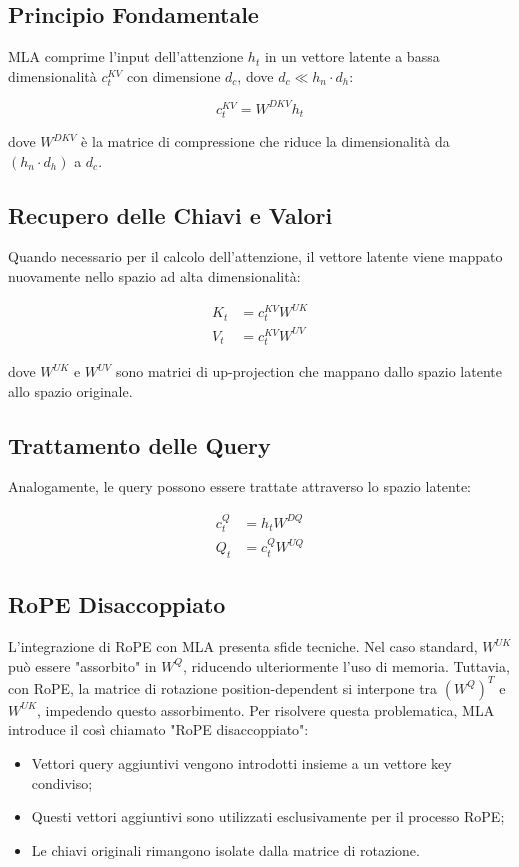 \subsection{Principio Fondamentale}
MLA comprime l'input dell'attenzione $h_t$ in un vettore latente a bassa dimensionalità $c_t^{KV}$ con dimensione $d_c$, dove $d_c \ll h_n \cdot d_h$:

\begin{equation}
    c_t^{KV} = W^{DKV}h_t
\end{equation}

dove $W^{DKV}$ è la matrice di compressione che riduce la dimensionalità da $(h_n \cdot d_h)$ a $d_c$.

\subsection{Recupero delle Chiavi e Valori}
Quando necessario per il calcolo dell'attenzione, il vettore latente viene mappato nuovamente nello spazio ad alta dimensionalità:

\begin{align*}
    K_t &= c_t^{KV} W^{UK} \\
    V_t &= c_t^{KV} W^{UV}
\end{align*}

dove $W^{UK}$ e $W^{UV}$ sono matrici di up-projection che mappano dallo spazio latente allo spazio originale.

\subsection{Trattamento delle Query}
Analogamente, le query possono essere trattate attraverso lo spazio latente:

\begin{align*}
    c_t^Q &= h_t W^{DQ} \\
    Q_t &= c_t^Q W^{UQ}
\end{align*}

\subsection{RoPE Disaccoppiato}
L'integrazione di RoPE con MLA presenta sfide tecniche. Nel caso standard, $W^{UK}$ può essere "assorbito" in $W^Q$, riducendo ulteriormente l'uso di memoria. Tuttavia, con RoPE, la matrice di rotazione position-dependent si interpone tra $(W^Q)^T$  e $W^{UK}$, impedendo questo assorbimento. Per risolvere questa problematica, MLA introduce il così chiamato "RoPE disaccoppiato":
\begin{itemize}
    \item Vettori query aggiuntivi vengono introdotti insieme a un vettore key condiviso;
    \item Questi vettori aggiuntivi sono utilizzati esclusivamente per il processo RoPE;
    \item Le chiavi originali rimangono isolate dalla matrice di rotazione.
\end{itemize}

